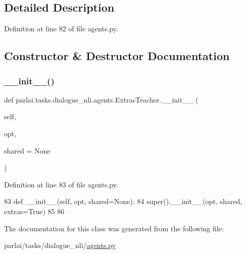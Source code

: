 \subsection{Detailed Description}


Definition at line 82 of file agents.\+py.



\subsection{Constructor \& Destructor Documentation}
\mbox{\label{classparlai_1_1tasks_1_1dialogue__nli_1_1agents_1_1ExtrasTeacher_a5713e0c8aa5f0dc996004e7028c7725b}} 
\subsubsection{\texorpdfstring{\+\_\+\+\_\+init\+\_\+\+\_\+()}{\_\_init\_\_()}}
{\footnotesize\ttfamily def parlai.\+tasks.\+dialogue\+\_\+nli.\+agents.\+Extras\+Teacher.\+\_\+\+\_\+init\+\_\+\+\_\+ (\begin{DoxyParamCaption}\item[{}]{self,  }\item[{}]{opt,  }\item[{}]{shared = {\ttfamily None} }\end{DoxyParamCaption})}



Definition at line 83 of file agents.\+py.


\begin{DoxyCode}
83     \textcolor{keyword}{def }\_\_init\_\_(self, opt, shared=None):
84         super().\_\_init\_\_(opt, shared, extras=\textcolor{keyword}{True})
85 
86 
\end{DoxyCode}


The documentation for this class was generated from the following file\+:\begin{DoxyCompactItemize}
\item 
parlai/tasks/dialogue\+\_\+nli/\hyperlink{parlai_2tasks_2dialogue__nli_2agents_8py}{agents.\+py}\end{DoxyCompactItemize}
